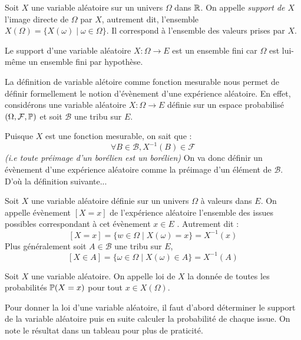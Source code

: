 \begin{definition}[Support]
    Soit $X$ une variable aléatoire sur un univers $\Omega$ dans $\mathbb{R}$. 
    On appelle \emph{support de $X$} l'image directe de $\Omega$ par $X$, autrement dit, 
    l'ensemble $X(\Omega) = \{X(\omega) \; | \; \omega \in \Omega\}$. Il correspond à l'ensemble 
    des valeurs prises par $X$.  
\end{definition}

Le support d'une variable aléatoire $X : \Omega \longrightarrow E$ est un ensemble fini car $\Omega$ est 
lui-même un ensemble fini par hypothèse.

\begin{proposition}
    La définition de variable alétoire comme fonction mesurable nous permet de définir formellement 
    le notion d'évènement d'une expérience aléatoire. En effet, considérons une variable aléatoire $X : \Omega \longrightarrow E$ 
    définie sur un espace probabilisé $(\Omega, \mathcal{F}, \mathbb{P})$ et soit $ \mathcal{B}$ une tribu sur $E$. 

    Puisque $X$ est une fonction mesurable, on sait que : 
        \[ \forall B \in \mathcal{B}, X^{-1}(B) \in \mathcal{F} \] 
    \emph{(i.e toute préimage d'un borélien est un borélien)} 
    On va donc définir un évènement d'une expérience aléatoire comme la préimage d'un élément de $ \mathcal{B}$. 
    D'où la définition suivante...
\end{proposition}

\begin{definition}
    Soit $X$ une variable aléatoire définie sur un univers $\Omega$ à valeurs dans $E$. 
    On appelle évènement $[X = x]$ de l'expérience aléatoire l'ensemble des issues possibles 
    correspondant à cet évènement $x \in E$ . 
    Autrement dit :
        \[ [X = x] = \{w \in \Omega \; | \; X(\omega) = x\} = X^{-1}(x) \] 
    Plus généralement soit $A \in \mathcal{B}$ une tribu sur $E$, 
        \[ [X \in A] = \{ \omega \in \Omega \; | \; X(\omega) \in A \} = X^{-1}(A) \] 
\end{definition}

\begin{definition}[Loi]
    Soit $X$ une variable aléatoire. On appelle loi de $X$ la donnée de toutes les probabilités $ \mathbb{P}(X = x)$ pour 
    tout $x \in X(\Omega)$.  
\end{definition}

Pour donner la loi d'une variable aléatoire, il faut d'abord déterminer le support de la variable aléatoire puis en suite 
calculer la probabilité de chaque issue. 
On note le résultat dans un tableau pour plus de praticité. 

